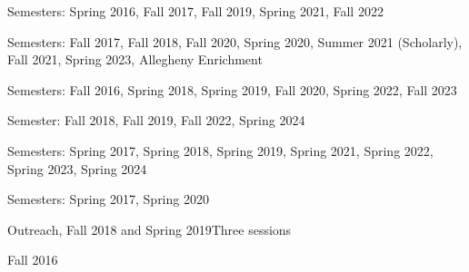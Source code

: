 \documentclass[11pt,a4paper]{moderncv}
\begin{document}


{Semesters: Spring 2016, Fall 2017, Fall 2019, Spring 2021, Fall 2022}{}{}{}


{Semesters: Fall 2017, Fall 2018, Fall 2020, Spring 2020, Summer 2021 (Scholarly), Fall 2021, Spring 2023, Allegheny Enrichment}{}{}{}

{Semesters: Fall 2016, Spring 2018, Spring 2019, Fall 2020, Spring 2022, Fall 2023}{}{}{}


{Semester: Fall 2018, Fall 2019, Fall 2022, Spring 2024}{}{}{}


{Semesters: Spring 2017, Spring 2018, Spring 2019, Spring 2021, Spring 2022, Spring 2023, Spring 2024}{}{}{}


{Semesters: Spring 2017, Spring 2020}{}{}{}


{Outreach, Fall 2018 and Spring 2019}{Three sessions}{}{}



{Fall 2016}{}{}{}
\end{document}
